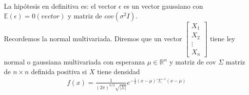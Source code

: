 \documentclass[10pt]{article}
\theoremstyle{plain}
\theoremstyle{definition}
\begin{document}
La hipótesis en definitiva es: el vector $\epsilon$ es un vector gaussiano con $\mathbb{E}(\epsilon) = 0 (vector)$ y matriz de $cov (\sigma^2I)$.\\

Recordemos la normal multivariada. Diremos que un vector $ \begin{bmatrix}
           X_{1} \\
           X_{2} \\
           \vdots \\
           X_{n}
         \end{bmatrix}$ tiene ley normal o gaussiana multivariada con esperanza $\mu \in \mathbb{R}^n$ y matriz de cov $\Sigma$ matriz de $n\times n$ definida positiva si $X$ tiene densidad
\begin{align*}
f(x) = \frac{1}{(2\pi)^{n/2}\sqrt{|\Sigma|}}e^{-\frac{1}{2}(x-\mu)'\Sigma^{-1}(x-\mu)}
\end{align*}
\end{document}
